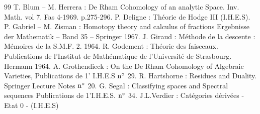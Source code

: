 

\begin{thebibliography}{99}\pageoriginale
{} T. Blum -- M. Herrera : De Rham Cohomology of an
  analytic Space. Inv. Math. vol 7. Fas 4-1969. p.275-296.
 P. Deligne : Théorie de Hodge III (I.H.E.S).
 P. Gabriel -- M. Zisman : Homotopy theory and calculus of
  fractions Ergebnisse der Mathematik -- Band 35 -- Springer 1967.
 J. Giraud : Méthode de la descente : Mémoires de la
  S.M.F. 2. 1964.
 R. Godement : Théorie des faisceaux.
                                Publications de l'Institut de
                                Mathématique de l'Université de
                                Strasbourg. Hermann 1964.
 A. Grothendieck : On the De Rham Cohomology of Algebraic
  Varieties, Publications de 1' I.H.E.S ${\rm n^{\circ}}$ 29.
 R. Hartshorne : Residues and Duality. Springer
  Lecture Notes ${\rm n^{\circ}}$ 20.
 G. Segal : Classifying spaces and Spectral sequences
  Publications de 1'I.H.E.S. ${\rm n^{\circ}}$ 34.
 J.L.Verdier : Catégories dérivées - Etat 0 -
  (I.H.E.S)
\end{thebibliography}

\ifx\danslelivre\undefined

\fi



